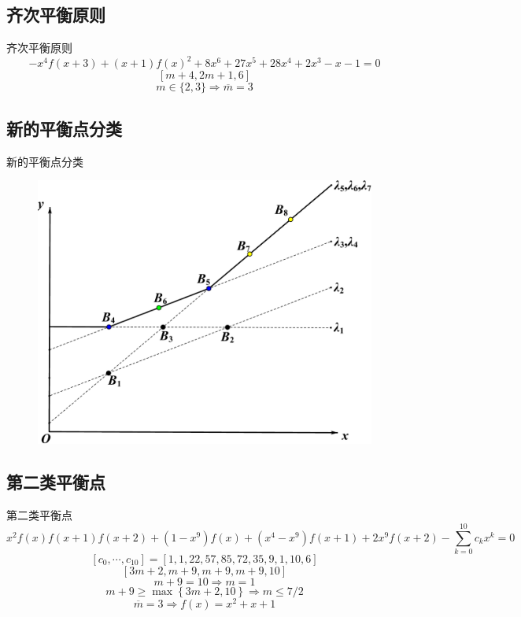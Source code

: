\documentclass{beamer}
\newcommand{\bbrace}[1]{\left\{#1\right\}}
\begin{document}
\subsection{齐次平衡原则}
\begin{frame}{齐次平衡原则}
\[
    -x^4f(x+3)+(x+1)f(x)^2+8x^6+27x^5+28x^4+2x^3-x-1=0
\]
\[
    [m+4,2m+1,6]
\]
\[
    m\in \{2,3\} \Rightarrow \overline{m}=3
\]
\end{frame}

\subsection{新的平衡点分类}
\begin{frame}{新的平衡点分类}
\begin{figure}
\centering
\includegraphics[height=0.8\textheight]{../paper/fig/ps.pdf}
\end{figure}
\end{frame}

\subsection{第二类平衡点}
\begin{frame}{第二类平衡点}
\small 
\[
    x^2f(x)f(x+1)f(x+2)+(1-x^9)f(x)+(x^4-x^9)f(x+1)+2x^9f(x+2)-\sum_{k=0}^{10}{c_k x^k}=0
\]
\[
    [c_0,\cdots,c_{10}]=[1,1,22,57,85,72,35,9,1,10,6]
\]
\[
    [3m+2,m+9,m+9,m+9,10]
\]
\[
    m+9=10 \Rightarrow m=1
\]
\[
    m+9 \ge \max\bbrace{3m+2,10} \Rightarrow m\le 7/2
\]
\[
    \overline{m}=3 \Rightarrow f(x)=x^2+x+1
\]
\end{frame}
\end{document}

